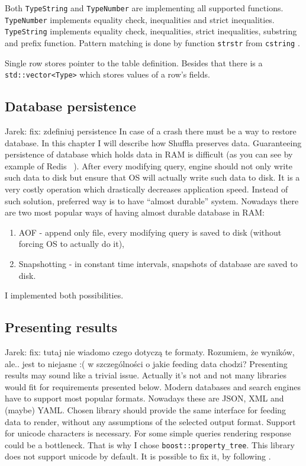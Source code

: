 \documentclass[10pt,a4paper]{article}
\newcommand{\jarek}[1]{\noindent\colorbox{myYellow}{Jarek: #1}}
\begin{document}
Both \verb|TypeString| and \verb|TypeNumber| are implementing all supported functions. \verb|TypeNumber| implements equality check, inequalities and strict inequalities. \verb|TypeString| implements equality check, inequalities, strict inequalities, substring and prefix function. Pattern matching is done by function \verb|strstr| from \verb|cstring| \cite{STRSTR}.

Single row stores pointer to the table definition. Besides that there is a \verb|std::vector<Type>| which stores values of a row's fields.

\subsection{Database persistence}

\jarek{fix: zdefiniuj persistence}
In case of a crash there must be a way to restore database. In this chapter I will describe how Shuffla preserves data. Guaranteeing persistence of database which holds data in RAM is difficult (as you can see by example of Redis ~\cite{REDPE}). After every modifying query, engine should not only write such data to disk but ensure that OS will actually write such data to disk. It is a very costly operation which drastically decreases application speed. Instead of such solution, preferred way is to have “almost durable” system.
Nowadays there are two most popular ways of having almost durable database in RAM:

\begin{enumerate}
\item AOF - append only file, every modifying query is saved to disk (without forcing OS to actually do it),
\item Snapshotting - in constant time intervals, snapshots of database are saved to disk.
\end{enumerate}
I implemented both possibilities. 

\subsection{Presenting results}

\jarek{fix: tutaj nie wiadomo czego dotyczą te formaty. Rozumiem, że wyników, ale.. jest to niejasne :( w szczególności o jakie feeding data chodzi?}
Presenting results may sound like a trivial issue. Actually it's not and not many libraries would fit for requirements presented below. Modern databases and search engines have to support most popular formats. Nowadays these are JSON, XML and (maybe) YAML. Chosen library should provide the same interface for feeding data to render, without any assumptions of the selected output format. Support for unicode characters is necessary. For some simple queries rendering response could be a bottleneck. That is why I chose \verb|boost::property_tree|. This library does not support unicode by default. It is possible to fix it, by following \cite{SOANS} .
\end{document}
